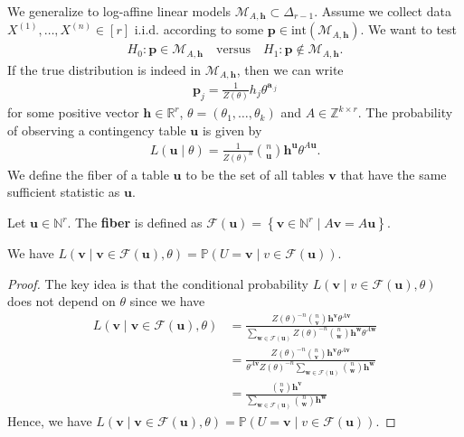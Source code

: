 We generalize to log-affine linear models \( \mathcal{M}_{A, \mathbf{h}} \subset \Delta_{r-1} \). Assume we collect data \( X^{(1)}, \dots, X^{(n)} \in [r] \) i.i.d. according to some \( \mathbf{p} \in \mathrm{int}(\mathcal{M}_{A, \mathbf{h}}) \). We want to test 
\begin{align*}
  H_0: \mathbf{p} \in \mathcal{M}_{A, \mathbf{h}} \quad \text{versus} \quad H_1: \mathbf{p} \notin \mathcal{M}_{A, \mathbf{h}}.
\end{align*}
If the true distribution is indeed in \( \mathcal{M}_{A, \mathbf{h}} \), then we can write 
\begin{align*}
  \mathbf{p}_j = \frac{1}{Z(\theta)} h_j \theta^{\mathbf{a}_{\cdot j}}
\end{align*}
for some positive vector \( \mathbf{h} \in \mathbb{R}^r \), \( \theta = (\theta_1, \dots, \theta_k) \) and \( A \in \mathbb{Z}^{k \times r} \). The probability of observing a contingency table \( \mathbf{u} \) is given by 
\begin{align*}
  L(\mathbf u \mid \theta) = \frac{1}{Z(\theta)^n} {n \choose \mathbf{u}} \mathbf h^{\mathbf{u}} \theta^{A \mathbf{u}}.
\end{align*}
We define the fiber of a table \( \mathbf u \) to be the set of all tables \( \mathbf v \) that have the same sufficient statistic as \( \mathbf{u} \).
\begin{defi}
  Let \( \mathbf{u} \in \mathbb{N}^r \). The \textbf{fiber} is defined as 
  \( \mathcal{F}(\mathbf{u}) = \left\{ \mathbf{v} \in \mathbb{N}^r \mid A \mathbf{v} = A \mathbf{u} \right\} \).
\end{defi}
\begin{prop}
  We have \(   L(\mathbf{v} \mid \mathbf{v} \in \mathcal{F}(\mathbf{u}), \theta) = \mathbb{P}(U = \mathbf{v} \mid v \in \mathcal{F}(\mathbf{u}))\).
\end{prop}
\begin{proof}
  The key idea is that the conditional probability \( L(\mathbf v \mid v \in \mathcal{F}(\mathbf{u}), \theta) \) does not depend on \( \theta \) since we have 
\begin{align*}
  L(\mathbf{v} \mid \mathbf{v} \in \mathcal{F}(\mathbf{u}), \theta) &= \frac{Z(\theta)^{-n} {n \choose \mathbf{v}} \mathbf{h}^{\mathbf{v}}  \theta^{A \mathbf{v}}}{\sum_{\mathbf{w} \in \mathcal{F}(\mathbf{u})} Z(\theta)^{-n} {n \choose \mathbf{w}} \mathbf{h}^{\mathbf{w}} \theta^{A \mathbf{w}}} \\
  &= \frac{Z(\theta)^{-n} {n \choose \mathbf{v}} \mathbf{h}^{\mathbf{v}}  \theta^{A \mathbf{v}}}{ \theta^{A \mathbf{v}}  Z(\theta)^{-n} \sum_{\mathbf{w} \in \mathcal{F}(\mathbf{u})} {n \choose \mathbf{w}} \mathbf{h}^{\mathbf{w}}} \\
  &= \frac{ {n \choose \mathbf{v}} \mathbf{h}^{\mathbf{v}}}{  \sum_{\mathbf{w} \in \mathcal{F}(\mathbf{u})} {n \choose \mathbf{w}} \mathbf{h}^{\mathbf{w}}}
\end{align*}
Hence, we have \(   L(\mathbf{v} \mid \mathbf{v} \in \mathcal{F}(\mathbf{u}), \theta) = \mathbb{P}(U = \mathbf{v} \mid v \in \mathcal{F}(\mathbf{u}))\).
\end{proof}

